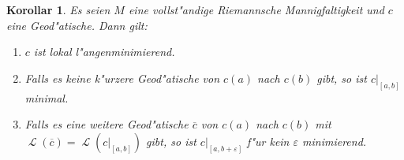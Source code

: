 \documentclass[paper=A4, twoside, chapterprefix=true, bibliography=totoc, headsepline]{scrbook}
\let\temp\phi
\let\phi\varphi
\let\varphi\temp
\let\temp\theta
\let\theta\vartheta
\let\vartheta\temp
\let\temp\epsilon
\let\epsilon\varepsilon
\let\varepsilon\temp
\let\temp\rho
\let\rho\varrho
\let\varrho\temp
\DeclareMathOperator{\calL}{\mathcal{L}}
\theoremstyle{plain}
\newtheorem{Kor}[Dfn]{Korollar}
\theoremstyle{nonumberplain}
\theoremstyle{empty}
\theoremstyle{break}
\begin{document}
\begin{Kor}\label{thm:kor-8-12}
  Es seien $M$ eine vollst"andige Riemannsche Mannigfaltigkeit und $c$ eine Geod"atische. Dann gilt:
  \begin{enumerate}[label=(\roman*),widest=iii,leftmargin=*]
  \item $c$ ist lokal l"angenminimierend.
  \item Falls es keine k"urzere Geod"atische von $c(a)$ nach $c(b)$ gibt, so ist $c|_{[a,b]}$ minimal.
  \item Falls es eine weitere Geod"atische $\overline{c}$ von $c(a)$ nach $c(b)$ mit $\calL(\overline c) = \calL(c|_{[a,b]})$ gibt, so ist $c|_{[a,b+\epsilon]}$ f"ur kein $\epsilon$ minimierend.\label{thm:kor-8-12-iii} 
  \end{enumerate}
\end{Kor}
\end{document}
